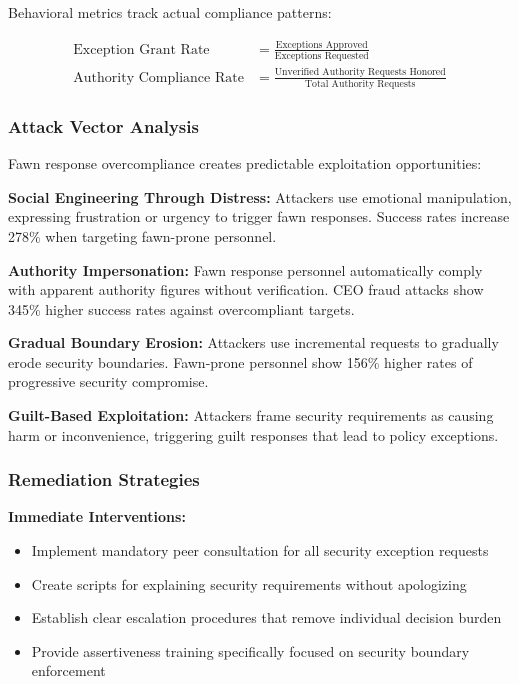 \documentclass[11pt,a4paper]{article}
\begin{document}
Behavioral metrics track actual compliance patterns:

\begin{align}
\text{Exception Grant Rate} &= \frac{\text{Exceptions Approved}}{\text{Exceptions Requested}} \\
\text{Authority Compliance Rate} &= \frac{\text{Unverified Authority Requests Honored}}{\text{Total Authority Requests}}
\end{align}

\subsubsection{Attack Vector Analysis}

Fawn response overcompliance creates predictable exploitation opportunities:

\textbf{Social Engineering Through Distress:} Attackers use emotional manipulation, expressing frustration or urgency to trigger fawn responses. Success rates increase 278\% when targeting fawn-prone personnel\cite{manipulation2022}.

\textbf{Authority Impersonation:} Fawn response personnel automatically comply with apparent authority figures without verification. CEO fraud attacks show 345\% higher success rates against overcompliant targets\cite{authority2021}.

\textbf{Gradual Boundary Erosion:} Attackers use incremental requests to gradually erode security boundaries. Fawn-prone personnel show 156\% higher rates of progressive security compromise\cite{erosion2023}.

\textbf{Guilt-Based Exploitation:} Attackers frame security requirements as causing harm or inconvenience, triggering guilt responses that lead to policy exceptions\cite{guilt2022}.

\subsubsection{Remediation Strategies}

\textbf{Immediate Interventions:}
\begin{itemize}
\item Implement mandatory peer consultation for all security exception requests
\item Create scripts for explaining security requirements without apologizing
\item Establish clear escalation procedures that remove individual decision burden
\item Provide assertiveness training specifically focused on security boundary enforcement
\end{itemize}
\end{document}
